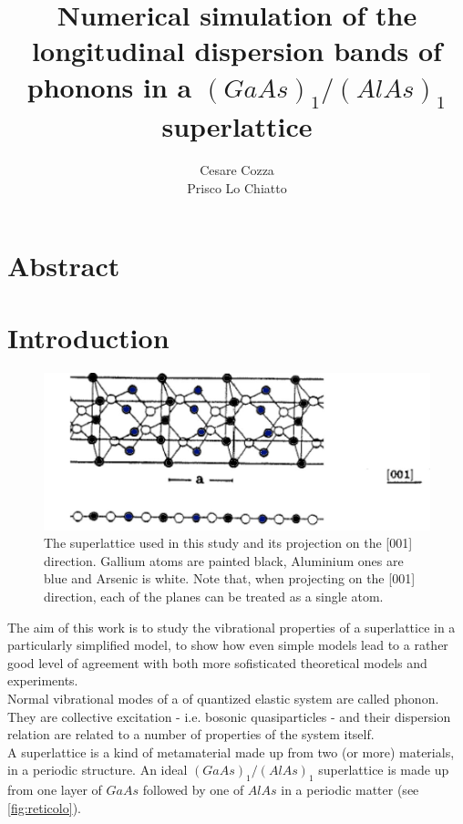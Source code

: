 \documentclass{article}
\begin{document}
 
	
	\author{Cesare Cozza \\ Prisco Lo Chiatto }
	\title{Numerical simulation of the longitudinal dispersion bands of phonons in a $(GaAs)_1/(AlAs)_1$ superlattice}
	\maketitle
    \newpage
    
    
\section{Abstract}




\section{Introduction}
\begin{figure}
	\centering
	\includegraphics[scale=0.3]{reticolo.jpg}
	\caption{The superlattice used in this study and its projection on the [001] direction. Gallium atoms are painted black, Aluminium ones are blue and Arsenic is white. Note that, when projecting on the [001] direction, each of the planes can be treated as a single atom.}
	\label{fig:reticolo}
\end{figure}
The aim of this work is to study the vibrational properties of a superlattice in a particularly simplified model, to show how even simple models lead to a rather good level of agreement with both more sofisticated theoretical models and experiments.\\
Normal vibrational modes of a of quantized elastic system are called phonon. They are collective excitation - i.e. bosonic quasiparticles - and their dispersion relation are related to a number of properties of the system itself. \\
A superlattice is a kind of metamaterial made up from two (or more) materials, in a periodic structure. An ideal $(GaAs)_1/(AlAs)_1$ superlattice is made up from one layer of $GaAs$ followed by one of $AlAs$ in a periodic matter (see \autoref{fig:reticolo}).\smallskip
\end{document}

